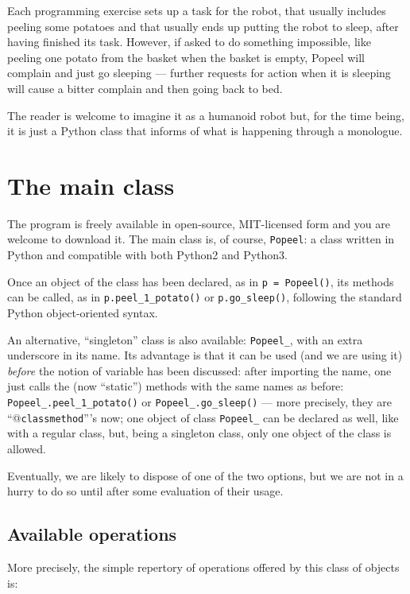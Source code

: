 \documentclass[12pt]{article}
\begin{document}
Each programming exercise sets up a task for the
robot, that usually includes peeling some potatoes
and that usually ends up putting the robot to sleep,
after having finished its task. However, if asked to
do something impossible, like peeling one potato
from the basket
when the basket is empty, Popeel will complain and
just go sleeping --- further requests for action
when it is sleeping will cause a bitter complain
and then going back to bed.

The reader is welcome to imagine it as a humanoid 
robot but, for the time being, it is just a Python 
class that informs of what is happening through
a monologue.


\section{The main class}

The program is freely available in open-source,
MIT-licensed form \cite{MITlicense} and you are welcome
to download it.
The main class is, of course, {\tt Popeel}: a class
written in Python and compatible with both
Python2 and Python3.

Once an object of the class has been declared,
as in {\tt p = Popeel()}, its methods can be
called, as in {\tt p.peel_1_potato()} or
{\tt p.go_sleep()}, following the standard
Python object-oriented syntax.

An alternative, ``singleton'' class is also 
available: {\tt Popeel_}, with an extra underscore
in its name. Its advantage is that it can be used
(and we are using it) {\it before} the notion
of variable has been discussed: after importing
the name, one just calls the (now ``static'') methods
with the same names as before: {\tt Popeel_.peel_1_potato()} 
or {\tt Popeel_.go_sleep()} --- more
precisely, they are ``@{\tt classmethod}'''s now; 
one object of class {\tt Popeel_} can be declared 
as well, like with a regular class, but, being a
singleton class, only one object of the class
is allowed. 

Eventually, we are likely to dispose of one of the 
two options, but we are not in a hurry to do so
until after some evaluation of their usage.

\subsection{Available operations}

More precisely, the simple repertory of operations
offered by this class of objects is:
\end{document}
